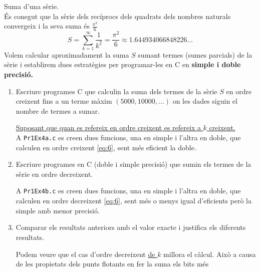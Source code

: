 \documentclass[a4paper, 12pt]{article}
\begin{document}
    \begin{exercici}
        Suma d'una sèrie.\\
        És conegut que la sèrie dels recíprocs dels quadrats dels nombres naturals convergeix i la
        seva suma és $\frac{\pi^2}{6}$
        \begin{equation}
            S = \sum\limits_{k=1}^\infty\frac{1}{k^2} = \frac{\pi^2}{6} \approx 1.644934066848226\dots
            \label{eq:6}
        \end{equation}
        Volem calcular aproximadament la suma $S$ sumant termes (sumes parcials) de la sèrie i
        establirem dues estratègies per programar-les en C en \textbf{simple i doble precisió.}\\
        \begin{enumerate}[label=\alph*)]
            \item Escriure programes C que calculin la suma dels termes de la sèrie $S$ en ordre
            creixent fins a un terme màxim $\left(5000, 10000, \dots\right)$ on les dades siguin el
            nombre de termes a sumar.\\
            \begin{solucio}
                \underline{Suposant que quan es refereix en ordre creixent es refereix a $k$ creixent.}\\
                A \verb|Pr1Ex4a.c| es creen dues funcions, una en simple i l'altra en doble, que
                calculen en ordre creixent \eqref{eq:6}, sent més eficient la doble.
            \end{solucio}
            \item Escriure programes en C (doble i simple precisió) que sumin els termes de la sèrie
            en ordre decreixent.\\
            \begin{solucio}
                A \verb|Pr1Ex4b.c| es creen dues funcions, una en simple i l'altra en doble, que
                calculen en ordre decreixent \eqref{eq:6}, sent més o menys igual d'eficients però
                la simple amb menor precisió.
            \end{solucio}
            \item Comparar els resultats anteriors amb el valor exacte i justifica els diferents
            resultats.\\
            \begin{solucio}
                Podem veure que el cas d'ordre decreixent \underline{de $k$} millora el càlcul.
                Això a causa de les propietats dels punts flotants en fer la suma els bits més

\end{solucio}
\end{enumerate}
\end{exercici}
\end{document}
